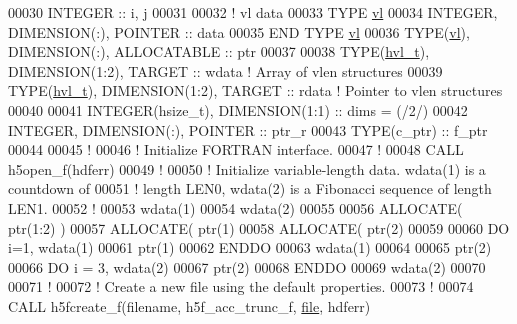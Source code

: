\begin{DoxyCode}
00030   \textcolor{keywordtype}{INTEGER} :: i, j
00031 
00032   \textcolor{comment}{! vl data}
00033   \textcolor{keyword}{TYPE} \hyperlink{structvl}{vl}
00034      \textcolor{keywordtype}{INTEGER}, \textcolor{keywordtype}{DIMENSION(:)}, \textcolor{keywordtype}{POINTER} :: data
00035 \textcolor{keyword}{  END TYPE }\hyperlink{structvl}{vl}
00036   \textcolor{keywordtype}{TYPE}(\hyperlink{structvl}{vl}), \textcolor{keywordtype}{DIMENSION(:)}, \textcolor{keywordtype}{ALLOCATABLE} :: ptr
00037 
00038   \textcolor{keywordtype}{TYPE}(\hyperlink{structhvl__t}{hvl\_t}), \textcolor{keywordtype}{DIMENSION(1:2)}, \textcolor{keywordtype}{TARGET} :: wdata \textcolor{comment}{! Array of vlen structures}
00039   \textcolor{keywordtype}{TYPE}(\hyperlink{structhvl__t}{hvl\_t}), \textcolor{keywordtype}{DIMENSION(1:2)}, \textcolor{keywordtype}{TARGET} :: rdata \textcolor{comment}{! Pointer to vlen structures}
00040 
00041   \textcolor{keywordtype}{INTEGER(hsize\_t)}, \textcolor{keywordtype}{DIMENSION(1:1)} :: dims = (/2/)
00042   \textcolor{keywordtype}{INTEGER}, \textcolor{keywordtype}{DIMENSION(:)}, \textcolor{keywordtype}{POINTER} :: ptr\_r 
00043   \textcolor{keywordtype}{TYPE}(c\_ptr) :: f\_ptr
00044   
00045   \textcolor{comment}{!}
00046   \textcolor{comment}{! Initialize FORTRAN interface.}
00047   \textcolor{comment}{!}
00048   \textcolor{keyword}{CALL }h5open\_f(hdferr)
00049   \textcolor{comment}{!}
00050   \textcolor{comment}{! Initialize variable-length data.  wdata(1) is a countdown of}
00051   \textcolor{comment}{! length LEN0, wdata(2) is a Fibonacci sequence of length LEN1.}
00052   \textcolor{comment}{!}
00053   wdata(1)%
00054   wdata(2)%
00055 
00056   \textcolor{keyword}{ALLOCATE}( ptr(1:2) )
00057   \textcolor{keyword}{ALLOCATE}( ptr(1)%
00058   \textcolor{keyword}{ALLOCATE}( ptr(2)%
00059 
00060   \textcolor{keywordflow}{DO} i=1, wdata(1)%
00061      ptr(1)%
00062 \textcolor{keywordflow}{  ENDDO}
00063   wdata(1)%
00064 
00065   ptr(2)%
00066   \textcolor{keywordflow}{DO} i = 3, wdata(2)%
00067      ptr(2)%
00068 \textcolor{keywordflow}{  ENDDO}
00069   wdata(2)%
00070 
00071   \textcolor{comment}{!}
00072   \textcolor{comment}{! Create a new file using the default properties.}
00073   \textcolor{comment}{!}
00074   \textcolor{keyword}{CALL }h5fcreate\_f(filename, h5f\_acc\_trunc\_f, \hyperlink{structfile}{file}, hdferr)

\end{DoxyCode}
